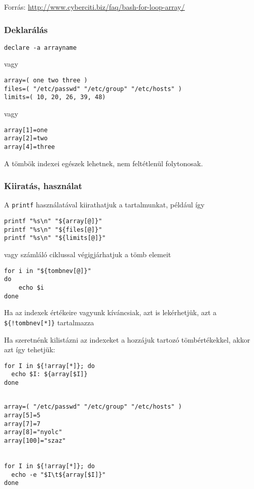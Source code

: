 Forrás: \url{http://www.cyberciti.biz/faq/bash-for-loop-array/}


\subsubsection*{Deklarálás}


\begin{lstlisting}
declare -a arrayname
\end{lstlisting}

vagy

\begin{lstlisting}
array=( one two three )
files=( "/etc/passwd" "/etc/group" "/etc/hosts" )
limits=( 10, 20, 26, 39, 48)
\end{lstlisting}

vagy

\begin{lstlisting}
array[1]=one
array[2]=two
array[4]=three
\end{lstlisting}

A tömbök indexei egészek lehetnek, nem feltétlenül folytonosak.

\subsubsection*{Kiiratás, használat}
A \texttt{printf} használatával kiirathatjuk a tartalmunkat, például így
\begin{lstlisting}
printf "%s\n" "${array[@]}"
printf "%s\n" "${files[@]}"
printf "%s\n" "${limits[@]}"
\end{lstlisting}

vagy számláló ciklussal végigjárhatjuk a tömb elemeit

\begin{lstlisting}
for i in "${tombnev[@]}"
do
	echo $i
done
\end{lstlisting}


Ha az indexek értékeire vagyunk kíváncsiak, azt is lekérhetjük, azt a \verb.${!tombnev[*]}. tartalmazza

Ha szeretnénk kilistázni az indexeket a hozzájuk tartozó tömbértékekkel, akkor azt így tehetjük:
\begin{lstlisting}
for I in ${!array[*]}; do
  echo $I: ${array[$I]}
done
\end{lstlisting}

\begin{lstlisting}

array=( "/etc/passwd" "/etc/group" "/etc/hosts" )
array[5]=5
array[7]=7
array[8]="nyolc"
array[100]="szaz"


for I in ${!array[*]}; do
  echo -e "$I\t${array[$I]}"
done
\end{lstlisting}
